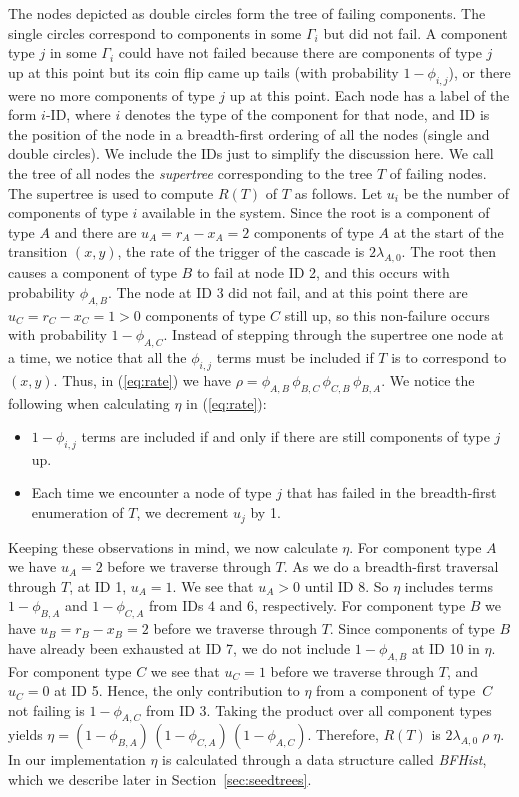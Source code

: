 \documentclass[12pt]{article}
\newcommand{\varName}[1]{\textrm{\it#1}}
\begin{document}
The nodes depicted as double circles form the tree of failing components. The single circles correspond to components in some $\Gamma_i$ but did not fail.  A component type $j$ in some $\Gamma_i$ could have not failed because there are components of type $j$ up at this point but its coin flip came up tails  (with probability $1 - \phi_{i, j}$), or there were no more components of type $j$ up at this point. Each node has a label of the form $i$-ID, where $i$ denotes the type of the component for that node, and ID is the position of the node in a breadth-first ordering of all the nodes (single and double circles). We include the IDs just to simplify the discussion here. We call the tree of all nodes the \textit{supertree} corresponding to the tree $T$ of failing nodes. The supertree is used to compute $R(T)$ of $T$ as follows. Let $u_i$ be the number of components of type $i$ available in the system. Since the root is a component of type $A$ and there are $u_A = r_A - x_A = 2$ components of type $A$ at the start of the transition $(x, y)$, the rate of the trigger of the cascade is $2 \lambda_{A, 0}$. The root then causes a component of type $B$ to fail at node ID 2, and this occurs with probability $\phi_{A, B}$. The node at ID 3 did not fail, and at this point there are $u_C = r_C - x_C = 1 > 0$ components of type $C$ still up, so this non-failure occurs with probability $1 - \phi_{A,C}$. Instead of stepping through the supertree one node at a time, we notice that all the $\phi_{i, j}$ terms must be included if $T$ is to correspond to $(x, y)$. Thus, in (\ref{eq:rate}) we have $\rho = \phi_{A, B} \, \phi_{B, C} \, \phi_{C, B} \, \phi_{B, A}$.
We notice the following when calculating $\eta$ in (\ref{eq:rate}): 
\begin{itemize} 
\item $1 - \phi_{i, j}$ terms are included if and only if there are still components of type $j$ up.
\item Each time we encounter a node of type $j$ that has failed in the breadth-first enumeration of $T$, we decrement $u_j$ by 1. 
\end{itemize}
Keeping these observations in mind, we now calculate $\eta$. For component type $A$ we have $u_A = 2$ before we traverse through $T$. As we do a breadth-first traversal through $T$, at ID 1, $u_A = 1$. We see that $u_A > 0$ until ID 8. So $\eta$ includes terms $1 - \phi_{B, A}$ and $1 - \phi_{C, A}$ from IDs $4$ and $6$, respectively. For component type $B$ we have $u_B = r_B - x_B  = 2$ before we traverse through $T$. Since components of type $B$ have already been exhausted at ID 7, we do not include $1 - \phi_{A, B}$ at ID 10 in $\eta$. For component type $C$ we see that $u_C = 1$ before we traverse through $T$, and $u_C = 0$ at ID 5. Hence, the only contribution to $\eta$ from a component of type~$C$ not failing is $1 - \phi_{A, C}$ from ID 3. Taking the product over all component types yields $\eta = (1 - \phi_{B, A}) \, (1 - \phi_{C, A}) \, (1 - \phi_{A,C})$. Therefore, $R(T)$ is $2 \lambda_{A, 0} \; \rho \; \eta$. In our implementation $\eta$ is calculated through a data structure called \varName{BFHist}, which we describe later in Section~\ref{sec:seedtrees}.
\end{document}
